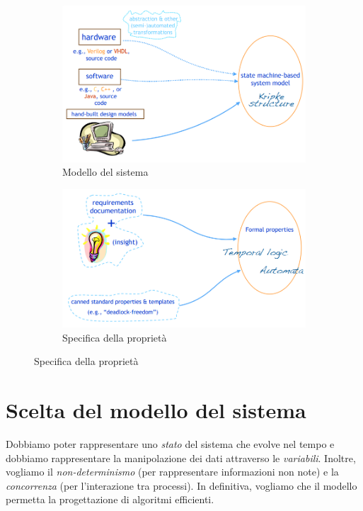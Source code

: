 \documentclass[a4paper,oneside,titlepage]{book}
\begin{document}
\begin{figure}[htp]
	\begin{subfigure}{0.49\textwidth}
	    \centering
		\includegraphics[width=\textwidth, height=\textheight, keepaspectratio]{mc4.png}
		\caption{Modello del sistema}
	\end{subfigure}
	\hfill
	\begin{subfigure}{0.49\textwidth}
	    \centering
		\includegraphics[width=\textwidth, height=\textheight, keepaspectratio]{mc5.png}
		\caption{Specifica della proprietà}
	\end{subfigure}
\end{figure}

\section{Scelta del modello del sistema} %
Dobbiamo poter rappresentare uno \textit{stato} del sistema che evolve nel tempo e dobbiamo rappresentare la manipolazione dei dati attraverso le \textit{variabili}. Inoltre, vogliamo il \textit{non-determinismo} (per rappresentare informazioni non note) e la \textit{concorrenza} (per l'interazione tra processi). In definitiva, vogliamo che il modello permetta la progettazione di algoritmi efficienti.
\end{document}
